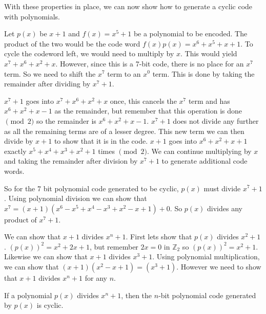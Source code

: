 
With these properties in place, we can now show how to generate a cyclic code with polynomials.  

\begin {example}{}
Let $p(x)$ be $x+1$ and $f(x) = x^5 + 1$ be a polynomial to be encoded.  The product of the two would be the code word $f(x)p(x) = x^6 + x^5 + x + 1$.  To cycle the codeword left, we would need to multiply by $x$. This would yield $x^7 + x^6 + x^2 + x$.  However, since this is a 7-bit code, there is no place for an $x^7$ term.  So we need to shift the $x^7$ term to an $x^0$ term.  This is done by 
taking the remainder after dividing by $x^7+1$.  

$x^7 + 1$ goes into $x^7 + x^6 + x^2 + x$ once, this cancels the $x^7$ term and has $x^6 + x^2 + x - 1$ as the remainder, but remember that this operation is done $\pmod 2$ so the remainder is $x^6 + x^2 + x - 1$.  $x^7 + 1$ does not divide any further as all the remaining terms are of a lesser degree.  
This new term we can then divide by $x+1$ to show that it is in the code.  $x+1$ goes into $x^6 + x^2 + x + 1$ exactly $x^5 + x^4 + x^3 + x^2 + 1$ times $\pmod2$.  We can continue multiplying by $x$ and taking the remainder after division by $x^7 + 1$ to generate additional code words.

So for the 7 bit polynomial code generated to be cyclic, $p(x)$ must divide $x^7 + 1$.  Using polynomial division we can show that $x^7 = (x+1)(x^6-x^5+x^4-x^3+x^2-x+1) + 0$.  So $p(x)$ divides any product of $x^7+1$.

We can show that $x+1$ divides $x^n + 1$.  First lets show that $p(x)$ divides $x^2 + 1$.  $(p(x))^2 = x^2 + 2x + 1$, but remember $2x = 0$ in $\mathbb{Z}_2$ so $(p(x))^2 = x^2 + 1$. Likewise we can show that $x+1$ divides $x^3 + 1$.  Using polynomial multiplication, we can show that $(x+1)(x^2 -x + 1) = (x^3 + 1)$.  However we need to show that $x+1$ divides $x^n+1$ for any $n$.
\end {example}

\begin {prop}{}
If a polynomial $p(x)$ divides $x^n + 1$, then the $n$-bit polynomial code generated by $p(x)$ is cyclic.
\end {prop}


